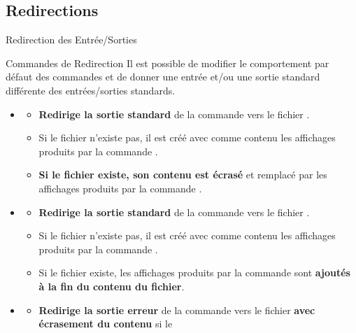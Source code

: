 \subsection{Redirections}
\begin{frame}{Redirection des Entrée/Sorties}
  \begin{block}{Commandes de Redirection}
    Il est possible de modifier le comportement par défaut des commandes
    et de donner une entrée et/ou une sortie standard différente des
    entrées/sorties standards.
    \begin{itemize}
    \item {}
      \begin{itemize}
      \item \textbf{{\color{solarizedRed}Redirige la sortie standard}} de la
        commande  vers le fichier .
      \item Si le fichier  n'existe pas, il est créé
        avec comme contenu les affichages produits par la commande
        .
      \item \textbf{{\color{solarizedBlue}Si le fichier 
            existe, son contenu est écrasé}} et remplacé par les
        affichages produits par la commande .
      \end{itemize}
    \item {}
      \begin{itemize}
      \item \textbf{{\color{solarizedRed}Redirige la sortie standard}} de la
        commande  vers le fichier .
      \item Si le fichier  n'existe pas, il est créé
        avec comme contenu les affichages produits par la commande
        .
      \item Si le fichier  existe, les affichages
        produits par la commande  sont
        \textbf{{\color{solarizedBlue}ajoutés à la fin du contenu du
            fichier}}.
      \end{itemize}
    \item {}
      \begin{itemize}
      \item \textbf{{\color{solarizedRed}Redirige la sortie erreur}} de la
        commande  vers le fichier 
        \textbf{{\color{solarizedBlue}avec écrasement du contenu}} si le

\end{itemize}
\end{itemize}
\end{block}
\end{frame}
